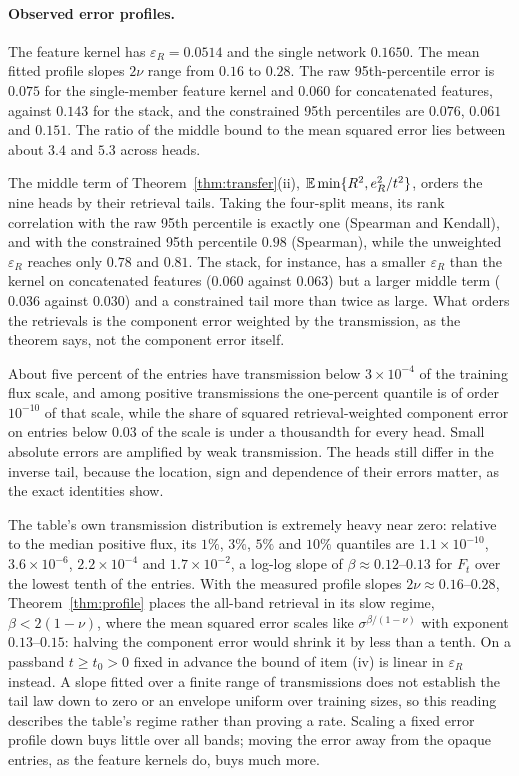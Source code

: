 \paragraph{Observed error profiles.}
The feature kernel has $\varepsilon_R=0.0514$ and the single network $0.1650$. The mean fitted
profile slopes $2\nu$ range from $0.16$ to $0.28$. The raw 95th-percentile error is $0.075$ for
the single-member feature kernel and $0.060$ for concatenated features, against $0.143$ for the
stack, and the constrained 95th percentiles are $0.076$, $0.061$ and $0.151$. The ratio of the
middle bound to the mean squared error lies between about $3.4$ and $5.3$ across heads.

The middle term of Theorem~\ref{thm:transfer}(ii), $\mathbb{E}\min\{R^2,e_R^2/t^2\}$, orders the nine
heads by their retrieval tails. Taking the four-split means, its rank correlation with the raw
95th percentile is exactly one (Spearman and Kendall), and with the constrained 95th percentile
$0.98$ (Spearman), while the unweighted $\varepsilon_R$ reaches only $0.78$ and $0.81$. The stack,
for instance, has a smaller $\varepsilon_R$ than the kernel on concatenated features ($0.060$
against $0.063$) but a larger middle term ($0.036$ against $0.030$) and a constrained tail more
than twice as large. What orders the retrievals is the component error weighted by the
transmission, as the theorem says, not the component error itself.

About five percent of the entries have transmission below $3\times10^{-4}$ of the training flux
scale, and among positive transmissions the one-percent quantile is of order $10^{-10}$ of that
scale, while the share of squared retrieval-weighted component error on entries below $0.03$ of
the scale is under a thousandth for every head. Small absolute errors are amplified by weak
transmission. The heads still differ in the inverse tail, because the location, sign and
dependence of their errors matter, as the exact identities show.

The table's own transmission distribution is extremely heavy near zero: relative to the median
positive flux, its $1\%$, $3\%$, $5\%$ and $10\%$ quantiles are $1.1\times10^{-10}$,
$3.6\times10^{-6}$, $2.2\times10^{-4}$ and $1.7\times10^{-2}$, a log-log slope of
$\beta\approx0.12$--$0.13$ for $F_t$ over the lowest tenth of the entries. With the measured
profile slopes $2\nu\approx0.16$--$0.28$, Theorem~\ref{thm:profile} places the all-band retrieval in
its slow regime, $\beta<2(1-\nu)$, where the mean squared error scales like
$\sigma^{\beta/(1-\nu)}$ with exponent $0.13$--$0.15$: halving the component error would shrink it
by less than a tenth. On a passband $t\ge t_0>0$ fixed in advance the bound of item (iv) is
linear in $\varepsilon_R$ instead. A slope fitted over a finite range of transmissions does not
establish the tail law down to zero or an envelope uniform over training sizes, so this reading
describes the table's regime rather than proving a rate. Scaling a fixed error profile down buys
little over all bands; moving the error away from the opaque entries, as the feature kernels do,
buys much more.

